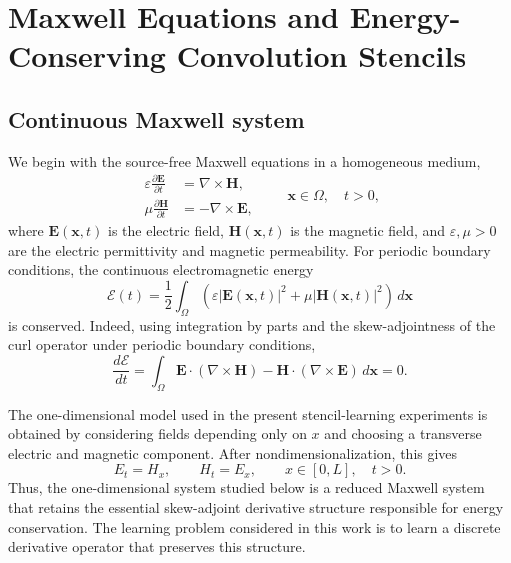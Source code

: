 \documentclass[11pt]{article}
\numberwithin{equation}{section}
\numberwithin{figure}{section}
\numberwithin{table}{section}
\begin{document}
\section{Maxwell Equations and Energy-Conserving Convolution Stencils}
\label{sec:stencils}
\subsection{Continuous Maxwell system}

We begin with the source-free Maxwell equations in a homogeneous medium,
\begin{equation}
\begin{aligned}
  \varepsilon \frac{\partial \mathbf E}{\partial t}
  &= \nabla \times \mathbf H,\\
  \mu \frac{\partial \mathbf H}{\partial t}
  &= - \nabla \times \mathbf E,
\end{aligned}
\qquad \mathbf x\in \Omega,\quad t>0,
\label{eq:full-maxwell}
\end{equation}
where $\mathbf E(\mathbf x,t)$ is the electric field, $\mathbf H(\mathbf x,t)$
is the magnetic field, and $\varepsilon,\mu>0$ are the electric permittivity
and magnetic permeability. For periodic boundary conditions, the continuous
electromagnetic energy
\begin{equation}
  \mathcal E(t)
  =
  \frac12 \int_{\Omega}
  \left(
  \varepsilon |\mathbf E(\mathbf x,t)|^2
  +
  \mu |\mathbf H(\mathbf x,t)|^2
  \right)\,d\mathbf x
  \label{eq:continuous-energy}
\end{equation}
is conserved. Indeed, using integration by parts and the skew-adjointness of
the curl operator under periodic boundary conditions,
\[
  \frac{d\mathcal E}{dt}
  =
  \int_{\Omega}
  \mathbf E\cdot(\nabla\times \mathbf H)
  -
  \mathbf H\cdot(\nabla\times \mathbf E)
  \,d\mathbf x
  =
  0.
\]

The one-dimensional model used in the present stencil-learning experiments is
obtained by considering fields depending only on $x$ and choosing a transverse
electric and magnetic component. After nondimensionalization, this gives
\begin{equation}
  E_t = H_x,\qquad H_t = E_x,
  \qquad x\in[0,L],\quad t>0.
  \label{eq:oned-maxwell-model}
\end{equation}
Thus, the one-dimensional system studied below is a reduced Maxwell system
that retains the essential skew-adjoint derivative structure responsible for
energy conservation. The learning problem considered in this work is to learn
a discrete derivative operator that preserves this structure.
\end{document}
